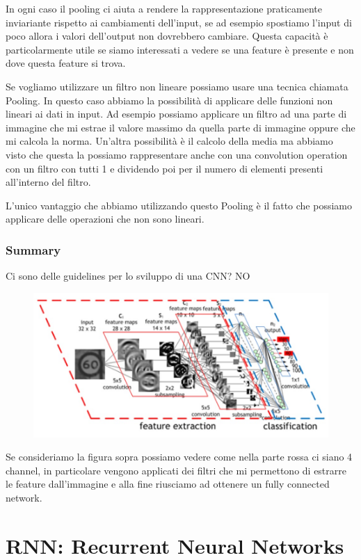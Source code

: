 \documentclass[14pt]{extreport}
\begin{document}
In ogni caso il pooling ci aiuta a rendere la rappresentazione praticamente inviariante rispetto ai cambiamenti dell'input, se ad esempio spostiamo
l'input di poco allora i valori dell'output non dovrebbero cambiare. Questa capacità è particolarmente utile se siamo interessati a vedere se una
feature è presente e non dove questa feature si trova.


Se vogliamo utilizzare un filtro non lineare possiamo usare una tecnica chiamata Pooling. In questo caso abbiamo la possibilità di applicare delle
funzioni non lineari ai dati in input. Ad esempio possiamo applicare un filtro ad una parte di immagine che mi estrae il valore massimo da quella
parte di immagine oppure che mi calcola la norma. Un'altra possibilità è il calcolo della media ma abbiamo visto che questa la possiamo rappresentare
anche con una convolution operation con un filtro con tutti 1 e dividendo poi per il numero di elementi presenti all'interno del filtro.

L'unico vantaggio che abbiamo utilizzando questo Pooling è il fatto che possiamo applicare delle operazioni che non sono lineari.

\subsubsection{Summary}

Ci sono delle guidelines per lo sviluppo di una CNN? NO

\begin{figure}[H]
	\centering
	\includegraphics[width=0.7\linewidth]{407.jpeg}
\end{figure}

Se consideriamo la figura sopra possiamo vedere come nella parte rossa ci siano 4 channel, in particolare vengono applicati dei filtri che mi
permettono di estrarre le feature dall'immagine e alla fine riusciamo ad ottenere un fully connected network.

\section{RNN: Recurrent Neural Networks}
\end{document}
